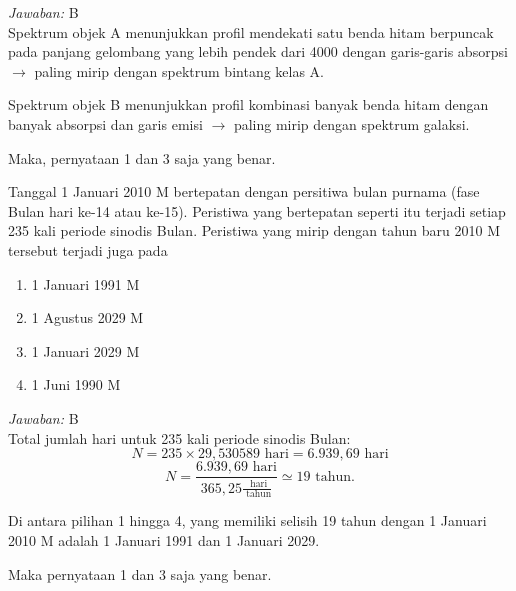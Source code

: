 \documentclass[11pt,fleqn]{exam}
\begin{document}
\begin{questions}
\textit{Jawaban: } B\\
Spektrum objek A menunjukkan profil mendekati satu benda hitam berpuncak pada panjang gelombang yang lebih pendek dari 4000 dengan garis-garis absorpsi $\rightarrow$ paling mirip dengan spektrum bintang kelas A.

Spektrum objek B menunjukkan profil kombinasi banyak benda hitam dengan banyak absorpsi dan garis emisi $\rightarrow$ paling mirip dengan spektrum galaksi.

Maka, pernyataan 1 dan 3 saja yang benar.

\question Tanggal 1 Januari 2010 M bertepatan dengan persitiwa bulan purnama (fase Bulan hari ke-14 atau ke-15). Peristiwa yang bertepatan seperti itu terjadi setiap 235 kali periode sinodis Bulan. Peristiwa yang mirip dengan tahun baru 2010 M tersebut terjadi juga pada
\begin{enumerate}
\item 1 Januari 1991 M
\item 1 Agustus 2029 M
\item 1 Januari 2029 M
\item 1 Juni 1990 M
\end{enumerate}

\textit{Jawaban: } B\\
Total jumlah hari untuk 235 kali periode sinodis Bulan:\\
$$N=235\times 29,530589\text{ hari}=6.939,69\text{ hari}$$
$$N=\frac{6.939,69\text{ hari}}{365,25\frac{\text{ hari}}{\text{ tahun}}}\simeq19\text{ tahun}.$$

Di antara pilihan 1 hingga 4, yang memiliki selisih 19 tahun dengan 1 Januari 2010 M adalah 1 Januari 1991 dan 1 Januari 2029.

Maka pernyataan 1 dan 3 saja yang benar. 


\end{questions}
\end{document}
